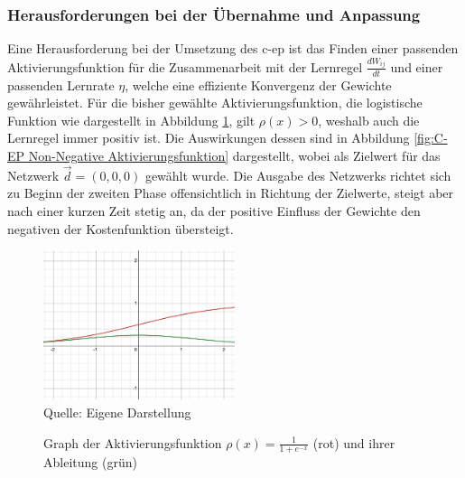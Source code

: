 \subsubsection{Herausforderungen bei der Übernahme und Anpassung}
\label{chap:Herausforderungen bei der Übernahme und Anpassung}

Eine Herausforderung bei der Umsetzung des \ac{c-ep} ist das Finden einer passenden Aktivierungsfunktion für die Zusammenarbeit mit der Lernregel \(\frac{dW_{ij}}{dt}\) und einer passenden Lernrate \(\eta\), welche eine effiziente Konvergenz der Gewichte gewährleistet. Für die bisher gewählte Aktivierungsfunktion, die logistische Funktion wie dargestellt in Abbildung \ref{fig:Graph der Aktivierungsfunktion}, gilt \(\rho(x) > 0\), weshalb auch die Lernregel immer positiv ist. Die Auswirkungen dessen sind in Abbildung \ref{fig:C-EP Non-Negative Aktivierungsfunktion} dargestellt, wobei als Zielwert für das Netzwerk \(\vec{d}=(0,0,0)\) gewählt wurde. Die Ausgabe des Netzwerks richtet sich zu Beginn der zweiten Phase offensichtlich in Richtung der Zielwerte, steigt aber nach einer kurzen Zeit stetig an, da der positive Einfluss der Gewichte den negativen der Kostenfunktion übersteigt.

\begin{figure}[h]
  \label{fig:Graph der Aktivierungsfunktion}
  \caption{Graph der Aktivierungsfunktion \(\rho(x)=\frac{1}{1+e^{-x}}\) (rot) und ihrer Ableitung (grün)}
  \includegraphics[width=0.5\textwidth]{abbildungen/sigmoid_funktion.png}
  \\
  Quelle: Eigene Darstellung
\end{figure}

